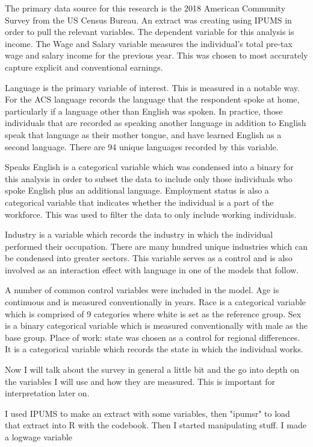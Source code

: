 \documentclass[12pt,english]{article}
\begin{document}
The primary data source for this research is the 2018 American Community Survey from the US Census Bureau. An extract was creating using IPUMS in order to pull the relevant variables. The dependent variable for this analysis is income. The Wage and Salary variable measures the individual's total pre-tax wage and salary income for the previous year. This was chosen to most accurately capture explicit and conventional earnings. 

Language is the primary variable of interest. This is measured in a notable way. For the ACS language records the language that the respondent spoke at home, particularly if a language other than English was spoken. In practice, those individuals that are recorded as speaking another language in addition to English speak that language as their mother tongue, and have learned English as a second language. There are 94 unique languages recorded by this variable. 

Speaks English is a categorical variable which was condensed into a binary for this analysis in order to subset the data to include only those individuals who spoke English plus an additional language. Employment status is also a categorical variable that indicates whether the individual is a part of the workforce. This was used to filter the data to only include working individuals.

Industry is a variable which records the industry in which the individual performed their occupation. There are many hundred unique industries which can be condensed into greater sectors. This variable serves as a control and is also involved as an interaction effect with language in one of the models that follow. 

A number of common control variables were included in the model. Age is continuous and is measured conventionally in years. Race is a categorical variable which is comprised of 9 categories where white is set as the reference group. Sex is a binary categorical variable which is measured conventionally with male as the base group. Place of work: state was chosen as a control for regional differences. It is a categorical variable which records the state in which the individual works. 

Now I will talk about the survey in general a little bit and the go into depth on the variables I will use and how they are measured. This is important for interpretation later on. 

I used IPUMS to make an extract with some variables, then "ipumsr" to load that extract into R with the codebook. Then I started manipulating stuff. 
I made a logwage variable
\end{document}
